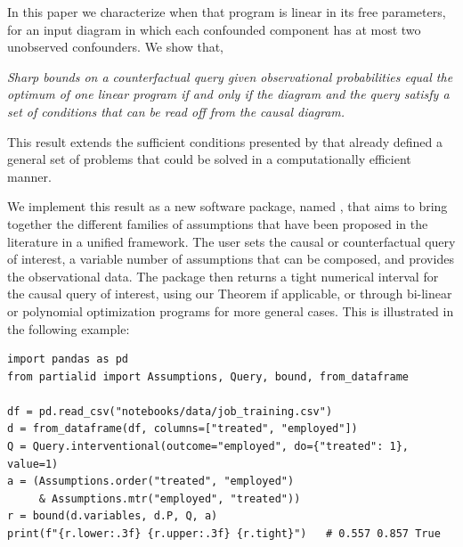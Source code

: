 In this paper we characterize when that program is linear in its free parameters, for an input diagram in which each confounded component has at most two unobserved confounders. We show that,

\begin{center}
\begin{minipage}{0.85\textwidth}
    \centering
    \textit{Sharp bounds on a counterfactual query given observational probabilities equal the optimum of one linear program if and only if the diagram and the query satisfy a set of conditions that can be read off from the causal diagram.}
\end{minipage}
\end{center}

This result extends the sufficient conditions presented by \citet{symbolicbounds2023general} that already defined a general set of problems that could be solved in a computationally efficient manner. 

We implement this result as a new software package, named \pid{}, that aims to bring together the different families of assumptions that have been proposed in the literature in a unified framework. The user sets the causal or counterfactual query of interest, a variable number of assumptions that can be composed, and provides the observational data. The package then returns a tight numerical interval for the causal query of interest, using our Theorem if applicable, or through bi-linear or polynomial optimization programs for more general cases. This is illustrated in the following example:
\begin{lstlisting}
import pandas as pd
from partialid import Assumptions, Query, bound, from_dataframe

df = pd.read_csv("notebooks/data/job_training.csv")
d = from_dataframe(df, columns=["treated", "employed"])
Q = Query.interventional(outcome="employed", do={"treated": 1}, value=1)
a = (Assumptions.order("treated", "employed")
     & Assumptions.mtr("employed", "treated"))
r = bound(d.variables, d.P, Q, a)
print(f"{r.lower:.3f} {r.upper:.3f} {r.tight}")   # 0.557 0.857 True
\end{lstlisting}
